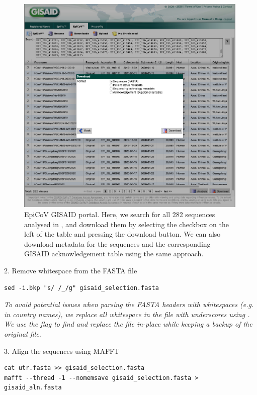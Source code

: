 \documentclass{article}
\newcommand{\ann}[1]{
\begin{adjustwidth}{0.5cm}{}
\it{#1}\\
\end{adjustwidth}}
\newcommand{\code}[1]{
{\upshape\ttfamily{#1}}}
\begin{document}
\begin{figure}[!ht]
    \centering
    \includegraphics[width=0.99\textwidth]{figs/gisaid_screenshot.png}
    \caption{EpiCoV GISAID portal. Here, we search for all 282 sequences analysed in \cite{travhist}, and download them by selecting the checkbox on the left of the table and pressing the download button. We can also download metadata for the sequences and the corresponding GISAID acknowledgement table using the same approach.}
    \label{fig:GISAID}
\end{figure}


2. Remove whitespace from the FASTA file
\begin{verbatim}
sed -i.bkp "s/ /_/g" gisaid_selection.fasta
\end{verbatim}

\ann{To avoid potential issues when parsing the FASTA headers with whitespaces (e.g. in country names), we replace all whitespace in the file with underscores using \code{sed}.  We use the \code{-i} flag to find and replace the file in-place while keeping a backup of the original file.}

3. Align the sequences using MAFFT
\begin{verbatim}
cat utr.fasta >> gisaid_selection.fasta
mafft --thread -1 --nomemsave gisaid_selection.fasta > gisaid_aln.fasta
\end{verbatim}
\end{document}
